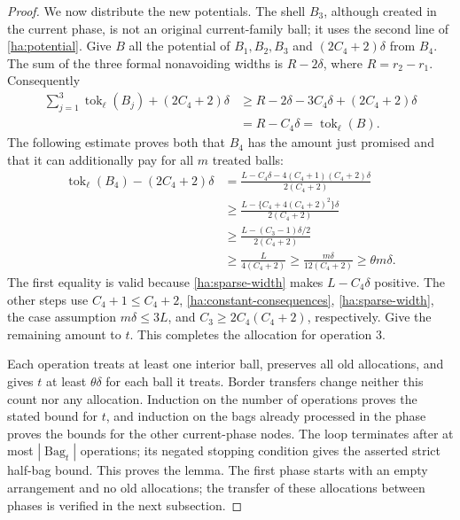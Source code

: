 \begin{proof}
We now distribute the new potentials.  The shell $B_3$, although
created in the current phase, is not an original current-family ball;
it uses the second line of \eqref{ha:potential}.  Give $B$ all the
potential of $B_1,B_2,B_3$ and $(2C_4+2)\delta$ from $B_4$.
The sum of the three formal nonavoiding widths is $R-2\delta$,
where $R=r_2-r_1$.  Consequently
\begin{align*}
 \sum_{j=1}^3\operatorname{tok}_\ell(B_j)+(2C_4+2)\delta
 &\geq R-2\delta-3C_4\delta+(2C_4+2)\delta\\
 &=R-C_4\delta=\operatorname{tok}_\ell(B).
\end{align*}
The following estimate proves both that $B_4$ has the amount just
promised and that it can additionally pay for all $m$ treated balls:
\begin{align*}
 \operatorname{tok}_\ell(B_4)-(2C_4+2)\delta
 &=\frac{L-C_4\delta-4(C_4+1)(C_4+2)\delta}{2(C_4+2)}\\
 &\geq\frac{L-\{C_4+4(C_4+2)^2\}\delta}{2(C_4+2)}\\
 &\geq\frac{L-(C_3-1)\delta/2}{2(C_4+2)}\\
 &\geq\frac{L}{4(C_4+2)}
 \geq\frac{m\delta}{12(C_4+2)}
 \geq\theta m\delta.
\end{align*}
The first equality is valid because \eqref{ha:sparse-width} makes
$L-C_4\delta$ positive.  The other steps use
$C_4+1\leq C_4+2$, \eqref{ha:constant-consequences},
\eqref{ha:sparse-width}, the case assumption $m\delta\leq3L$, and
$C_3\geq2C_4(C_4+2)$, respectively.  Give the remaining amount to $t$.
This completes the allocation for operation 3.

Each operation treats at least one interior ball, preserves all old
allocations, and gives $t$ at least $\theta\delta$ for each ball it
treats.  Border transfers change neither this count nor any allocation.
Induction on the number of operations proves the stated bound for
$t$, and induction on the bags already processed in the phase proves
the bounds for the other current-phase nodes.  The loop terminates
after at most $|\operatorname{Bag}_t|$ operations; its negated stopping
condition gives the asserted strict half-bag bound.  This proves the
lemma.  The first phase starts with an empty arrangement and no old
allocations; the transfer of these allocations between phases is
verified in the next subsection.
\end{proof}
